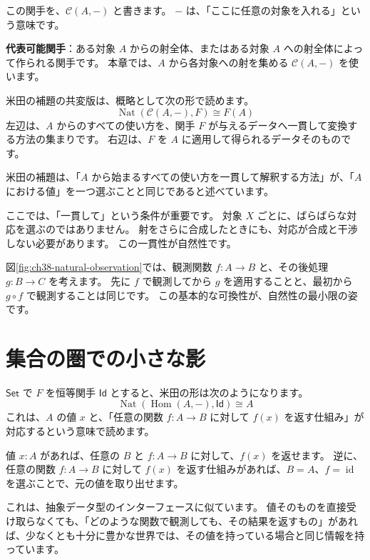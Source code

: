 この関手を、\(\mathcal{C}(A,-)\) と書きます。
\(-\) は、「ここに任意の対象を入れる」という意味です。

\textbf{代表可能関手}：ある対象 \(A\) からの射全体、またはある対象 \(A\) への射全体によって作られる関手です。
本章では、\(A\) から各対象への射を集める \(\mathcal{C}(A,-)\) を使います。

米田の補題の共変版は、概略として次の形で読めます。
\[
  \operatorname{Nat}(\mathcal{C}(A,-), F) \cong F(A)
\]
左辺は、\(A\) からのすべての使い方を、関手 \(F\) が与えるデータへ一貫して変換する方法の集まりです。
右辺は、\(F\) を \(A\) に適用して得られるデータそのものです。

米田の補題は、「\(A\) から始まるすべての使い方を一貫して解釈する方法」が、「\(A\) における値」を一つ選ぶことと同じであると述べています。

ここでは、「一貫して」という条件が重要です。
対象 \(X\) ごとに、ばらばらな対応を選ぶのではありません。
射をさらに合成したときにも、対応が合成と干渉しない必要があります。
この一貫性が自然性です。


図\ref{fig:ch38-natural-observation}では、観測関数 \(f : A \to B\) と、その後処理 \(g : B \to C\) を考えます。
先に \(f\) で観測してから \(g\) を適用することと、最初から \(g \circ f\) で観測することは同じです。
この基本的な可換性が、自然性の最小限の姿です。

\section{集合の圏での小さな影}

\(\mathsf{Set}\) で \(F\) を恒等関手 \(\mathsf{Id}\) とすると、米田の形は次のようになります。
\[
  \operatorname{Nat}(\operatorname{Hom}(A,-), \mathsf{Id}) \cong A
\]
これは、\(A\) の値 \(x\) と、「任意の関数 \(f : A \to B\) に対して \(f(x)\) を返す仕組み」が対応するという意味で読めます。

値 \(x : A\) があれば、任意の \(B\) と \(f : A \to B\) に対して、\(f(x)\) を返せます。
逆に、任意の関数 \(f : A \to B\) に対して \(f(x)\) を返す仕組みがあれば、\(B = A\)、\(f = \operatorname{id}\) を選ぶことで、元の値を取り出せます。

これは、抽象データ型のインターフェースに似ています。
値そのものを直接受け取らなくても、「どのような関数で観測しても、その結果を返すもの」があれば、少なくとも十分に豊かな世界では、その値を持っている場合と同じ情報を持っています。

